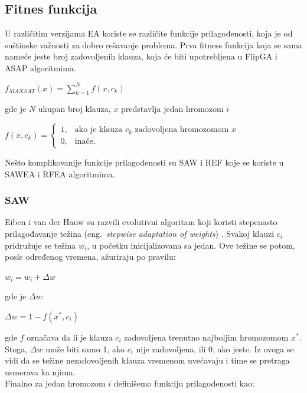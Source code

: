 \documentclass[a4paper]{article}
\begin{document}
\subsection{Fitnes funkcija}
\label{sec:ea_fitness}
U različitim verzijama EA koriste se različite funkcije prilagođenosti, koja je od suštinske
važnosti za dobro rešavanje problema. 
Prva fitness funkcija koja se sama nameće jeste broj zadovoljenih klauza, 
koja će biti upotrebljena u FlipGA i ASAP algoritmima.

	\begin{center}
	$ f_{MAXSAT} (x) = \sum_{k=1}^{N} f(x, c_k) $
	\end{center} 
	
gde je $N$ ukupan broj klauza, $x$ predstavlja jedan hromozom $i$

	\begin{center}
$ f(x, c_k) = \begin{cases} 1, & \mbox{ako je klauza } c_k \mbox{ zadovoljena hromozomom } x \\ 0, & \mbox{inače.} \end{cases} $
	\end{center}
Nešto komplikovanije funkcije prilagođenosti su SAW i REF koje se koriste
u SAWEA i RFEA algoritmima.


\subsubsection{SAW}
\label{sec:fitness_saw}
Eiben i van der Hauw su razvili evolutivni algoritam koji koristi 
stepenasto prilagođavanje težina (eng.~{\em stepwise adaptation of weights}) 
\cite{fitnes}. Svakoj klauzi $c_i$ pridružuje se težina 
$w_i$, u početku inicijalizovana sa jedan. Ove težine se potom, 
posle određenog vremena, ažuriraju po pravilu:  
	\begin{center}
	$ w_i = w_i + \Delta w $
	\end{center}
gde je $\Delta w$:
	\begin{center}
	$ \Delta w = 1 - f(x^*, c_i) $
	\end{center}
gde $f$ označava da li je klauza $c_i$ zadovoljena trenutno najboljim
hromozomom $x^*$. Stoga, $\Delta w$ može biti samo 1, ako $c_i$ nije zadovoljena, 
ili 0, ako jeste. Iz ovoga se vidi da se težine nezadovoljenih klauza vremenom uvećavaju
i time se pretraga usmerava ka njima. \\

Finalno za jedan hromozom $ i $ definišemo funkciju prilagođenosti kao:
\end{document}
